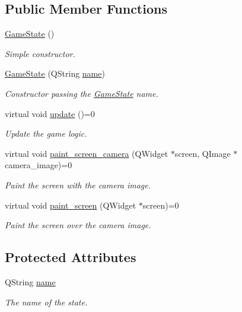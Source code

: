 \subsection*{Public Member Functions}
\begin{DoxyCompactItemize}
\item 
\hyperlink{class_game_state_a4fa0a2bf50315c4a35a3890a0adcee5c}{Game\-State} ()
\begin{DoxyCompactList}\small\item\em Simple constructor. \end{DoxyCompactList}\item 
\hypertarget{class_game_state_ada7dbd11a28aa98aecf6914353245bff}{\hyperlink{class_game_state_ada7dbd11a28aa98aecf6914353245bff}{Game\-State} (Q\-String \hyperlink{class_game_state_ab30c2bb30e4236231ae97976576c130a}{name})}\label{class_game_state_ada7dbd11a28aa98aecf6914353245bff}

\begin{DoxyCompactList}\small\item\em Constructor passing the \hyperlink{class_game_state}{Game\-State} name. \end{DoxyCompactList}\item 
virtual void \hyperlink{class_game_state_ab2864bfa04f92f6966861a1f2883bda0}{update} ()=0
\begin{DoxyCompactList}\small\item\em Update the game logic. \end{DoxyCompactList}\item 
virtual void \hyperlink{class_game_state_aac32d423dd6ebe9c1dbbf4c02b1b8d61}{paint\-\_\-screen\-\_\-camera} (Q\-Widget $\ast$screen, Q\-Image $\ast$camera\-\_\-image)=0
\begin{DoxyCompactList}\small\item\em Paint the screen with the camera image. \end{DoxyCompactList}\item 
virtual void \hyperlink{class_game_state_a3ea5432d8db8538bc18ab4cf0fdfc871}{paint\-\_\-screen} (Q\-Widget $\ast$screen)=0
\begin{DoxyCompactList}\small\item\em Paint the screen over the camera image. \end{DoxyCompactList}\end{DoxyCompactItemize}
\subsection*{Protected Attributes}
\begin{DoxyCompactItemize}
\item 
\hypertarget{class_game_state_ab30c2bb30e4236231ae97976576c130a}{Q\-String \hyperlink{class_game_state_ab30c2bb30e4236231ae97976576c130a}{name}}\label{class_game_state_ab30c2bb30e4236231ae97976576c130a}

\begin{DoxyCompactList}\small\item\em The name of the state. \end{DoxyCompactList}\end{DoxyCompactItemize}


